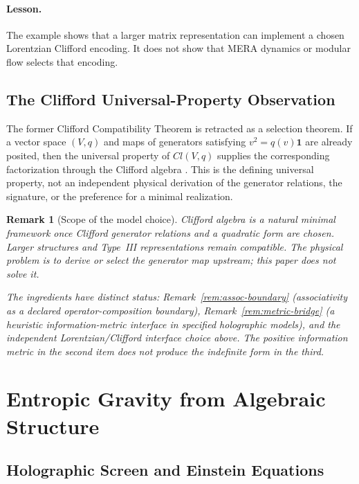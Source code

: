 \documentclass[12pt]{article}
\newtheorem{remark}[theorem]{Remark}
\begin{document}
\paragraph{Lesson.}
The example shows that a larger matrix representation can implement a chosen Lorentzian Clifford encoding.  It does not show that MERA dynamics or modular flow selects that encoding.

\subsection{The Clifford Universal-Property Observation}

The former Clifford Compatibility Theorem is retracted as a selection theorem.  If a vector space $(V,q)$ and maps of generators satisfying $v^2=q(v)\mathbf1$ are already posited, then the universal property of $Cl(V,q)$ supplies the corresponding factorization through the Clifford algebra \cite{Hestenes1966,Doran2003}.  This is the defining universal property, not an independent physical derivation of the generator relations, the signature, or the preference for a minimal realization.

\begin{remark}[Scope of the model choice]
\label{rem:scope}
Clifford algebra is a natural minimal framework once Clifford generator relations and a quadratic form are chosen.  Larger structures and Type~III representations remain compatible.  The physical problem is to derive or select the generator map upstream; this paper does not solve it.

The ingredients have distinct status:
Remark~\ref{rem:assoc-boundary} (associativity as a declared operator-composition boundary),
Remark~\ref{rem:metric-bridge} (a heuristic information-metric interface in specified holographic models),
and the independent Lorentzian/Clifford interface choice above.  The positive information metric in the second item does not produce the indefinite form in the third.
\end{remark}

\section{Entropic Gravity from Algebraic Structure}
\label{sec:entropic}

\subsection{Holographic Screen and Einstein Equations}
\end{document}
